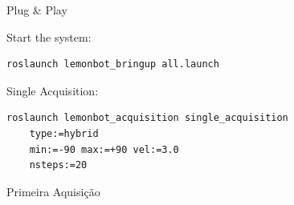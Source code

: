 \begin{frame}[fragile]{Plug \& Play}
							
	Start the system:
							
\begin{lstlisting}
roslaunch lemonbot_bringup all.launch
\end{lstlisting}
						
	Single Acquisition:
						
\begin{lstlisting}
roslaunch lemonbot_acquisition single_acquisition
    type:=hybrid
    min:=-90 max:=+90 vel:=3.0
    nsteps:=20
\end{lstlisting}
							  
							        
\end{frame}

{
\begin{frame}{Primeira Aquisição}

\end{frame}
}